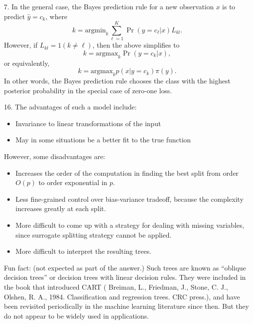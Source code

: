 \documentclass[12pt]{article}
\begin{document}
7. In the general case, the Bayes prediction rule for a new observation $x$ is to predict $\hat{y} = c_k$, where
\[
k = \text{argmin}_k \sum_{\ell=1}^{K} \Pr(y=c_\ell|x) L_{kl}.
\]
However, if $L_{kl} = 1(k \neq \ell)$, then the above simplifies to
\[
k = \text{argmax}_k \Pr(y = c_k|x),
\]
or equivalently,
\[
k = \text{argmax}_k p(x|y=c_k) \pi(y).
\]
In other words, the Bayes prediction rule chooses the class with the highest posterior probability in the special case of zero-one loss.

16. The advantages of such a model include:
\begin{itemize}
\item Invariance to linear transformations of the input
\item May in some situations be a better fit to the true function
\end{itemize}
However, some disadvantages are:
\begin{itemize}
\item Increases the order of the computation in finding the best split from order $O(p)$ to order exponential in $p$.
\item Less fine-grained control over bias-variance tradeoff, because the complexity increases greatly at each split.
\item More difficult to come up with a strategy for dealing with missing variables, since surrogate splitting strategy cannot be applied.
\item More difficult to interpret the resulting trees.
\end{itemize}

Fun fact: (not expected as part of the answer.)  Such trees are known as ``oblique decision trees'' or decision trees with linear decision rules.  They were included in the book that introduced CART ( Breiman, L., Friedman, J., Stone, C. J., Olshen, R. A., 1984. Classification and regression trees. CRC press.), and have been revisited periodically in the machine learning literature since then.  But they do not appear to be widely used in applications.
\end{document}
